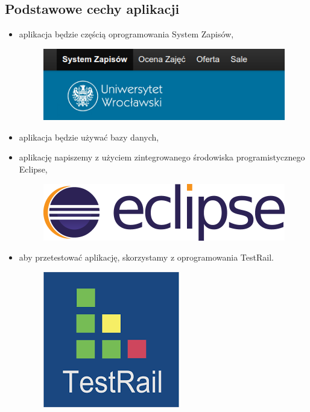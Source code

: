 \documentclass{article}
\begin{document}
\subsection{Podstawowe cechy aplikacji}
\begin{itemize}
 \item aplikacja będzie częścią oprogramowania System Zapisów,
\begin{figure}[H]
	\begin{center}
		\includegraphics[scale=0.3]{syst.png}
	\end{center}
\end{figure}
 \item aplikacja będzie używać bazy danych,
 \item aplikację napiszemy z użyciem zintegrowanego środowiska programistycznego Eclipse,
 \begin{figure}[H]
	\begin{center}
		\includegraphics[scale=0.12]{eclipse.png}
	\end{center}
\end{figure}
 \item aby przetestować aplikację, skorzystamy z oprogramowania TestRail.
 \begin{figure}[H]
	\begin{center}
		\includegraphics[scale=0.2]{testrail.png}
	\end{center}
\end{figure}
\end{itemize}
\end{document}
